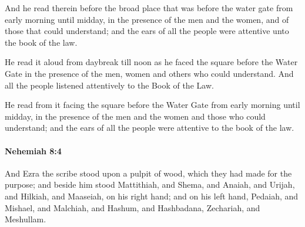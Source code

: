 			\begin{versebox}
					\item[BHS] 
					\item[LXX] 
					\item[ASV] And he read therein before the broad place that was before the water gate from early morning until midday, in the presence of the men and the women, and of those that could understand; and the ears of all the people were attentive unto the book of the law.
					\item[NIV] He read it aloud from daybreak till noon as he faced the square before the Water Gate in the presence of the men, women and others who could understand. And all the people listened attentively to the Book of the Law.
					\item[NRSV] He read from it facing the square before the Water Gate from early morning until midday, in the presence of the men and the women and those who could understand; and the ears of all the people were attentive to the book of the law.
			\end{versebox}

		\paragraph{Nehemiah 8:4} %
			\label{NEHEMIAH-8-4}

			And Ezra the scribe stood upon a pulpit of wood, which they had made for the purpose; and beside him stood Mattithiah, and Shema, and Anaiah, and Urijah, and Hilkiah, and Maaseiah, on his right hand; and on his left hand, Pedaiah, and Mishael, and Malchiah, and Hashum, and Hashbadana, Zechariah, and Meshullam.

